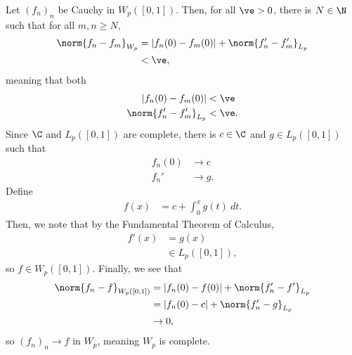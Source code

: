 \documentclass[10pt]{mypackage}
\begin{document}
Let $\left( f_n \right)_n$ be Cauchy in $W_p\left( [0,1] \right)$. Then, for all $\ve > 0$, there is $N\in \N$ such that for all $m,n\geq N$,
\begin{align*}
  \norm{f_n-f_m}_{W_p} &= \left\vert f_n(0)-f_m(0) \right\vert + \norm{f_n' - f_m'}_{L_p}\\
                       &< \ve,
\end{align*}
meaning that both
\begin{align*}
  \left\vert f_n(0)-f_m(0) \right\vert &< \ve\\
  \norm{f_n'-f_m'}_{L_p} &<\ve.
\end{align*}
Since $\C$ and $L_p\left( [0,1] \right)$ are complete, there is $c\in \C$ and $g\in L_p\left( [0,1] \right)$ such that
\begin{align*}
  f_n(0) &\rightarrow c\\
  f_n' &\rightarrow g.
\end{align*}
Define
\begin{align*}
  f(x) &= c + \int_{0}^{x} g(t)\:dt.
\end{align*}
Then, we note that by the Fundamental Theorem of Calculus,
\begin{align*}
  f'(x) &= g(x)\\
        &\in L_p\left( [0,1] \right),
\end{align*}
so $f\in W_p\left( [0,1] \right)$. Finally, we see that
\begin{align*}
  \norm{f_n-f}_{W_p\left( [0,1] \right)} &= \left\vert f_n(0) - f(0) \right\vert + \norm{f_n' - f'}_{L_p}\\
                                         &= \left\vert f_n(0) - c \right\vert + \norm{f_n'-g}_{L_p}\\
                                         &\rightarrow 0,
\end{align*}
so $\left( f_n \right)_n\rightarrow f$ in $W_p$, meaning $W_p$ is complete.
\end{document}
